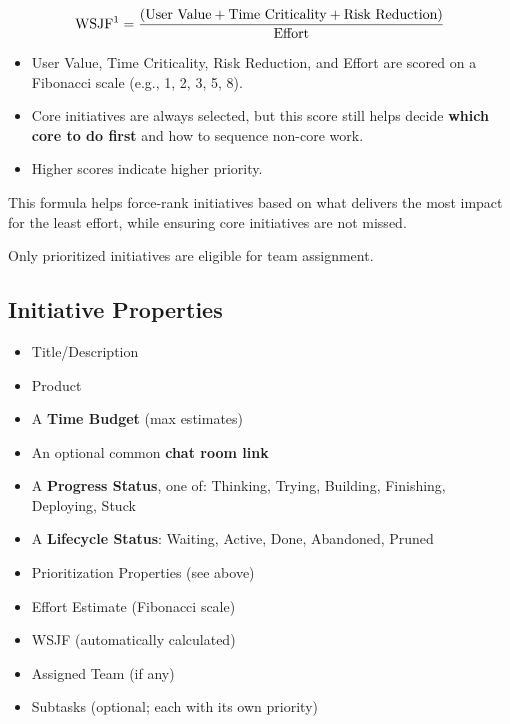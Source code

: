 \documentclass[a4paper]{article}
\begin{document}
\[\text{WSJF\footnotemark} = \dfrac{(\text{User Value} + \text{Time Criticality} + \text{Risk Reduction})}{\text{Effort}}\]

\begin{itemize}
    \item User Value, Time Criticality, Risk Reduction, and Effort are scored on a Fibonacci scale (e.g., 1, 2, 3, 5, 8).
    \item Core initiatives are always selected, but this score still helps decide \textbf{which core to do first} and how to sequence non-core work.
    \item Higher scores indicate higher priority.
\end{itemize}

This formula helps force-rank initiatives based on what delivers the most impact for the least effort, while ensuring core initiatives are not missed.

Only prioritized initiatives are eligible for team assignment.

\subsection*{Initiative Properties}

\begin{itemize}
    \item Title/Description
    \item Product
    \item A \textbf{Time Budget} (max estimates)
    \item An optional common \textbf{chat room link}
    \item A \textbf{Progress Status}, one of:
        Thinking,
        Trying,
        Building,
        Finishing,
        Deploying,
        Stuck
    \item A \textbf{Lifecycle Status}: Waiting, Active, Done, Abandoned, Pruned
    \item Prioritization Properties (see above)
    \item Effort Estimate (Fibonacci scale)
    \item WSJF (automatically calculated)
    \item Assigned Team (if any)
    \item Subtasks (optional; each with its own priority)
\end{itemize}
\end{document}
